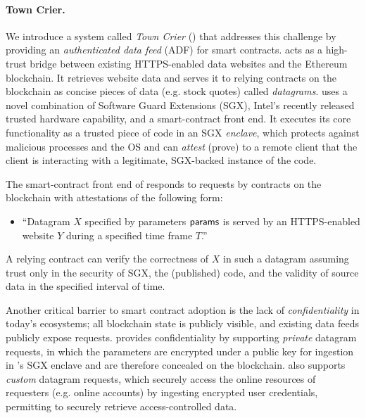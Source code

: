 \paragraph{\bf Town Crier.} We introduce a system called \emph{Town Crier} (\tc) that addresses this challenge by providing an \emph{authenticated data feed} (ADF) for smart contracts. \tc acts as a high-trust bridge between existing HTTPS-enabled data websites and the Ethereum blockchain. It retrieves website data and serves it to relying contracts on the blockchain as concise pieces of data (e.g. stock quotes) called \emph{datagrams}. \tc uses a novel combination of Software Guard Extensions (SGX), Intel's recently released trusted hardware capability, and a smart-contract front end. It executes its core functionality as a trusted piece of code in an SGX \emph{enclave}, which protects against malicious processes and the OS and can \emph{attest} (prove) to a remote client that the client is interacting with a legitimate, SGX-backed instance of the \tc code. 

The smart-contract front end of \tcs responds to requests by contracts on the blockchain with attestations of the following form:

\vspace{-1ex}
\begin{itemize}[leftmargin=3mm]
  \item[] {``Datagram $X$ specified by parameters ${\sf params}$ is served by an HTTPS-enabled website $Y$ during a specified time frame $T$.''}
\end{itemize}
\vspace{-1ex}

\noindent A relying contract can verify the correctness of $X$ in such a datagram assuming trust only in the security of SGX, the (published) \tc code, and the validity of source data in the specified interval of time. 

Another critical barrier to smart contract adoption is the lack of {\em confidentiality} in today's ecosystems; all blockchain state is publicly visible, and existing data feeds publicly expose requests. \tc provides confidentiality by supporting {\em private} datagram requests, in which the parameters are encrypted under a \tc public key for ingestion in \tc's SGX enclave and are therefore concealed on the blockchain. \tc also supports {\em custom} datagram requests, which securely access the online resources of requesters (e.g. online accounts) by ingesting encrypted user credentials, permitting \tc to securely retrieve access-controlled data.

